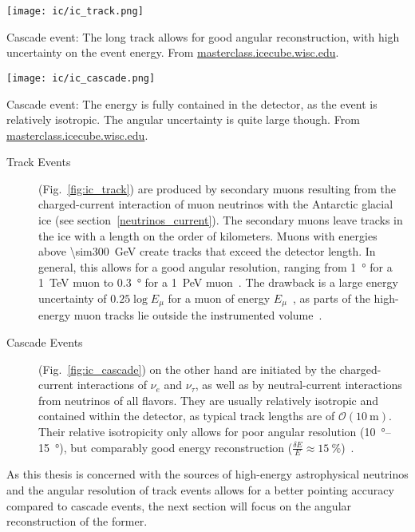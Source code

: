 \begin{marginfigure}
    \texttt{[image: ic/ic\_track.png]}
    \caption[Track event in IceCube]{Cascade event: The long track allows for good angular reconstruction, with high uncertainty on the event energy. From \url{masterclass.icecube.wisc.edu}.}
\end{marginfigure}
\begin{marginfigure}
    \texttt{[image: ic/ic\_cascade.png]}
    \caption[Cascade event in IceCube]{Cascade event: The energy is fully contained in the detector, as the event is relatively isotropic. The angular uncertainty is quite large though. From \url{masterclass.icecube.wisc.edu}.}
\end{marginfigure}
\begin{description}
    \item[Track Events] (Fig.~\ref{fig:ic_track}) are produced by secondary muons resulting from the charged-current interaction of muon neutrinos with the Antarctic glacial ice (see section~\ref{neutrinos_current}). The secondary muons leave tracks in the ice with a length on the order of kilometers. Muons with energies above \SI{\sim300}{\giga\eV} create tracks that exceed the detector length. In general, this allows for a good angular resolution, ranging from \SI{1}{\degree} for a \SI{1}{\TeV} muon to \SI{0.3}{\degree} for a \SI{1}{\peta\eV} muon~. The drawback is a large energy uncertainty of $0.25 \log{E_\mu}$ for a muon of energy $E_\mu$~, as parts of the high-energy muon tracks lie outside the instrumented volume~.

    \item[Cascade Events] (Fig.~\ref{fig:ic_cascade}) on the other hand are initiated by the charged-current interactions of $\nu_e$ and $\nu_\tau$, as well as by neutral-current interactions from neutrinos of all flavors. They are usually relatively isotropic and contained within the detector, as typical track lengths are of $\mathcal{O}(\SI{10}{\meter})$. Their relative isotropicity only allows for poor angular resolution (\SIrange{10}{15}{\degree}), but comparably good energy reconstruction ($\frac{\delta E}{E} \approx \SI{15}{\percent}$)~\cite{Aartsen2017a}.
\end{description}

As this thesis is concerned with the sources of high-energy astrophysical neutrinos and the angular resolution of track events allows for a better pointing accuracy compared to cascade events, the next section will focus on the angular reconstruction of the former.

